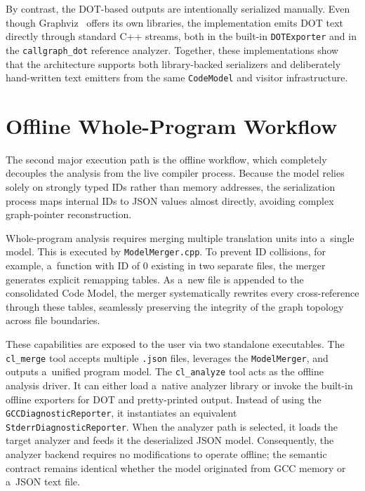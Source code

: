 \documentclass[xpsejal00-gcc-plugin.tex]{subfiles}
\begin{document}
\noindent
\begin{minipage}{\linewidth}
  \hfill
  
\end{minipage}
By contrast, the DOT-based outputs are intentionally serialized manually.
Even though Graphviz~\cite{Graphviz} offers its own libraries, the implementation emits DOT text directly through standard C++ streams, both in the built-in \texttt{DOTExporter} and in the \texttt{callgraph\_dot} reference analyzer.
Together, these implementations show that the architecture supports both library-backed serializers and deliberately hand-written text emitters from the same \texttt{CodeModel} and visitor infrastructure.

\section{Offline Whole-Program Workflow}\label{sec:serialization}

The second major execution path is the offline workflow, which completely decouples the analysis from the live compiler process.
Because the model relies solely on strongly typed IDs rather than memory addresses, the serialization process maps internal IDs to JSON values almost directly, avoiding complex graph-pointer reconstruction.

Whole-program analysis requires merging multiple translation units into a~single model.
This is executed by \texttt{ModelMerger.cpp}.
To prevent ID collisions, for example, a~function with ID of 0 existing in two separate files, the merger generates explicit remapping tables.
As a~new file is appended to the consolidated Code Model, the merger systematically rewrites every cross-reference through these tables, seamlessly preserving the integrity of the graph topology across file boundaries.

These capabilities are exposed to the user via two standalone executables.
The \texttt{cl\_merge} tool accepts multiple \texttt{.json} files, leverages the \texttt{ModelMerger}, and outputs a~unified program model.
The \texttt{cl\_analyze} tool acts as the offline analysis driver.
It can either load a~native analyzer library or invoke the built-in offline exporters for DOT and pretty-printed output.
Instead of using the \texttt{GCCDiagnosticReporter}, it instantiates an equivalent \texttt{StderrDiagnosticReporter}.
When the analyzer path is selected, it loads the target analyzer and feeds it the deserialized JSON model.
Consequently, the analyzer backend requires no modifications to operate offline; the semantic contract remains identical whether the model originated from GCC memory or a~JSON text file.
\end{document}
